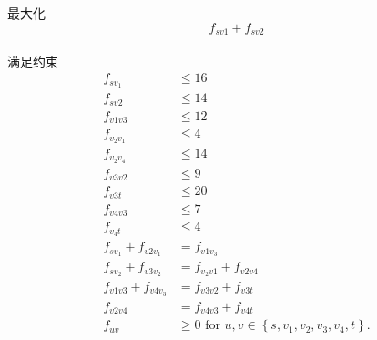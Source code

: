 \documentclass[a4paper, justified]{tufte-handout}
\begin{document}
\begin{solution}
  最大化$$f_{sv1}+f_{sv2}$$\\
  满足约束\\
  $$
    \begin{array}{ll}
      f_{s v_1}               & \leq 16                                                                \\
      f_{s v 2}               & \leq 14                                                                \\
      f_{v 1 v 3}             & \leq 12                                                                \\
      f_{v_2 v_1}             & \leq 4                                                                 \\
      f_{v_2 v_4}             & \leq 14                                                                \\
      f_{v 3 v 2}             & \leq 9                                                                 \\
      f_{v 3 t}               & \leq 20                                                                \\
      f_{v 4 v 3}             & \leq 7                                                                 \\
      f_{v_4 t}               & \leq 4                                                                 \\
      f_{s v_1}+f_{v 2 v_1}   & =f_{v 1 v_3}                                                           \\
      f_{s v_2}+f_{v 3 v_2}   & =f_{v_2 v 1}+f_{v 2 v 4}                                               \\
      f_{v 1 v 3}+f_{v 4 v_3} & =f_{v 3 v 2}+f_{v 3 t}                                                 \\
      f_{v 2 v 4}             & =f_{v 4 v 3}+f_{v 4 t}                                                 \\
      f_{u v}                 & \geq 0 \text { for } u, v \in\left\{s, v_1, v_2, v_3, v_4, t\right\} .
    \end{array}
  $$
\end{solution}


\begin{problem}[TC 29.2-6]
\end{problem}
\end{document}
